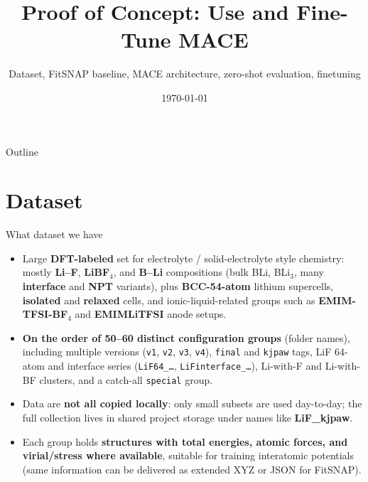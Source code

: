\documentclass[aspectratio=169]{beamer}
\title{Proof of Concept: Use and Fine-Tune MACE}
\subtitle{Dataset, FitSNAP baseline, MACE architecture, zero-shot evaluation, finetuning}
\author{} %
\institute{} %
\date{\today}
\begin{document}
\begin{frame}
  \titlepage
\end{frame}

\begin{frame}{Outline}
  \tableofcontents
\end{frame}

\section{Dataset}

\begin{frame}{What dataset we have}
  \begin{itemize}
    \item Large \textbf{DFT-labeled} set for electrolyte / solid-electrolyte style chemistry: mostly \textbf{Li--F}, \textbf{LiBF$_4$}, and \textbf{B--Li} compositions (bulk BLi, BLi$_3$, many \textbf{interface} and \textbf{NPT} variants), plus \textbf{BCC-54-atom} lithium supercells, \textbf{isolated} and \textbf{relaxed} cells, and ionic-liquid-related groups such as \textbf{EMIM-TFSI-BF$_4$} and \textbf{EMIMLiTFSI} anode setups.
    \item \textbf{On the order of 50--60 distinct configuration groups} (folder names), including multiple versions (\texttt{v1}, \texttt{v2}, \texttt{v3}, \texttt{v4}), \texttt{final} and \texttt{kjpaw} tags, LiF 64-atom and interface series (\texttt{LiF64\_…}, \texttt{LiFinterface\_…}), Li-with-F and Li-with-BF clusters, and a catch-all \texttt{special} group.
    \item Data are \textbf{not all copied locally}: only small subsets are used day-to-day; the full collection lives in shared project storage under names like \textbf{LiF\_kjpaw}.
    \item Each group holds \textbf{structures with total energies, atomic forces, and virial/stress where available}, suitable for training interatomic potentials (same information can be delivered as extended XYZ or JSON for FitSNAP).
  \end{itemize}
\end{frame}
\end{document}
